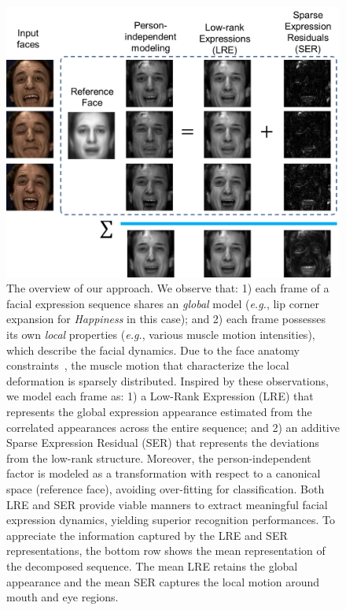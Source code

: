 \documentclass[journal]{IEEEtran}
\begin{document}
\begin{figure}[t]
	\centering
		\includegraphics[width=.95\columnwidth]{pics/splash.png}
	\caption{The overview of our approach. We observe that: 1) each frame of a facial expression sequence shares an \textit{global} model (\textit{e.g.}, lip corner expansion for \textit{Happiness} in this case); and 2) each frame possesses its own \textit{local} properties (\textit{e.g.}, various muscle motion intensities), which describe the facial dynamics. Due to the face anatomy constraints~\cite{Ekman78}, the muscle motion that characterize the local deformation is sparsely distributed. Inspired by these observations, we model each frame as: 1) a Low-Rank Expression (LRE) that represents the global expression appearance estimated from the correlated appearances across the entire sequence; and 2) an additive Sparse Expression Residual (SER) that represents the deviations from the low-rank structure. Moreover, the person-independent factor is modeled as a transformation with respect to a canonical space (reference face), avoiding over-fitting for classification. Both LRE and SER provide viable manners to extract meaningful facial expression dynamics, yielding superior recognition performances. To appreciate the information captured by the LRE and SER representations, the bottom row shows the mean representation of the decomposed sequence. The mean LRE retains the global appearance and the mean SER captures the local motion around mouth and eye regions.}
	\label{fig:splash}
\end{figure}
\end{document}
